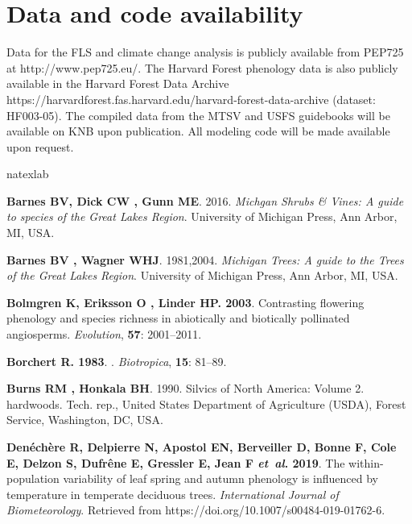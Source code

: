 \documentclass[11pt]{article}
\begin{document}
\section*{Data and code availability}
Data for the FLS and climate change analysis is publicly available from PEP725 at http://www.pep725.eu/. The Harvard Forest phenology data is also publicly available in the Harvard Forest Data Archive https://harvardforest.fas.harvard.edu/harvard-forest-data-archive (dataset: HF003-05). The compiled data from the MTSV and USFS guidebooks will be available on KNB upon publication. All modeling code will be made available upon request.


%
\begin{thebibliography}{48}
\expandafter\ifx\csname natexlab\endcsname\relax\def\natexlab#1{#1}\fi

{\bf Barnes BV, Dick CW , Gunn ME}. 2016.
\newblock \emph{Michgan Shrubs & Vines: A guide to species of the Great Lakes
  Region}.
\newblock University of Michigan Press, Ann Arbor, MI, USA.

{\bf Barnes BV , Wagner WHJ}. 1981,2004.
\newblock \emph{Michigan Trees: A guide to the Trees of the Great Lakes
  Region}.
\newblock University of Michigan Press, Ann Arbor, MI, USA.

{\bf Bolmgren K, Eriksson O , Linder HP}{\bf . 2003}.
\newblock Contrasting flowering phenology and species richness in abiotically
  and biotically pollinated angiosperms.
\newblock \emph{Evolution}, {\bf 57}: 2001--2011.

{\bf Borchert R}{\bf . {1983}}.
.
\newblock \emph{{Biotropica}}, {\bf {15}}: {81--89}.

{\bf Burns RM , Honkala BH}. 1990.
\newblock Silvics of North America: Volume 2. hardwoods.
\newblock Tech. rep., United States Department of Agriculture (USDA), Forest
  Service, Washington, DC, USA.

{\bf Den{\'e}ch{\`e}re R, Delpierre N, Apostol EN, Berveiller D, Bonne F, Cole
  E, Delzon S, Dufr{\^e}ne E, Gressler E, Jean F \emph{et~al}}{\bf . 2019}.
\newblock The within-population variability of leaf spring and autumn phenology
  is influenced by temperature in temperate deciduous trees.
\newblock \emph{International Journal of Biometeorology}. 
\newblock Retrieved from https://doi.org/10.1007/s00484-019-01762-6.


\end{thebibliography}
\end{document}
